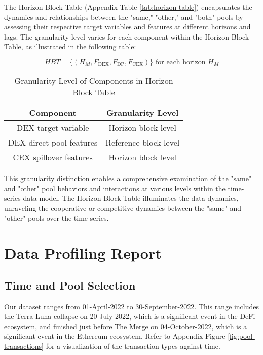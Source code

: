\documentclass{article}
\begin{document}
The Horizon Block Table (Appendix Table \ref{tab:horizon-table}) encapsulates the dynamics and relationships between the "same," "other," and "both" pools by assessing their respective target variables and features at different horizons and lags. The granularity level varies for each component within the Horizon Block Table, as illustrated in the following table:

\begin{equation}
HBT = \{ (H_{M}, F_{\text{DEX}}, F_{\text{DP}}, F_{\text{CEX}}) \} \text{ for each horizon } H_{M} 
\end{equation}

\begin{table}[htbp]
\centering
\begin{tabular}{|c|c|}
\hline
\textbf{Component} & \textbf{Granularity Level} \\
\hline
DEX target variable & Horizon block level \\
\hline
DEX direct pool features & Reference block level \\
\hline
CEX spillover features & Horizon block level \\
\hline
\end{tabular}
\caption{Granularity Level of Components in Horizon Block Table}
\label{table:granularity}
\end{table}

This granularity distinction enables a comprehensive examination of the "same" and "other" pool behaviors and interactions at various levels within the time-series data model. The Horizon Block Table illuminates the data dynamics, unraveling the cooperative or competitive dynamics between the "same" and "other" pools over the time series.

\section{Data Profiling Report}

\subsection{Time and Pool Selection}

Our dataset ranges from 01-April-2022 to 30-September-2022. This range includes the Terra-Luna collapse on 20-July-2022, which is a significant event in the DeFi ecosystem, and finished just before The Merge on 04-October-2022, which is a significant event in the Ethereum ecosystem. Refer to Appendix Figure \ref{fig:pool-transactions} for a visualization of the transaction types against time.
\end{document}
